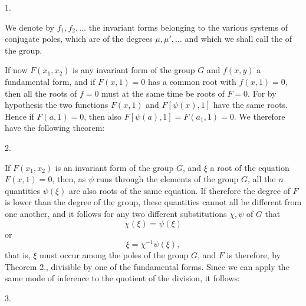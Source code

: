 
1.~

We denote by $f_1, f_2, \ldots$ the invariant forms belonging
to the various systems of conjugate poles, which are of the
degrees $\mu, \mu', \ldots$ and which we shall call the  of the group.

If now $F(x_1, x_2)$ is any invariant form of the
group $G$ and $f(x, y)$ a fundamental form, and if $F(x, 1) = 0$
has a common root with $f(x, 1) = 0$, then all the roots
of $f = 0$ must at the same time be roots of $F = 0$. For
by hypothesis the two functions $F(x, 1)$ and
$F[\psi(x), 1]$ have the same roots. Hence if $F(a, 1) = 0$,
then also $F[\psi(a), 1] = F(a_1, 1) = 0$. We therefore have the
following theorem:

2.~

If $F(x_1, x_2)$ is an invariant form of the group $G$, and $\xi$
a root of the equation $F(x, 1) = 0$, then, as
$\psi$ runs through the elements of the group $G$, all the
$n$ quantities $\psi(\xi)$ are also roots of the same equation. If therefore the
degree of $F$ is lower than the degree of the group, these
quantities cannot all be different from one another, and it
follows for any two different substitutions
$\chi, \psi$ of $G$ that
\[
\chi(\xi) = \psi(\xi)
\]
or
\[
\xi = \chi^{-1}\psi(\xi),
\]
that is, $\xi$ must occur among the poles of the group $G$, and
$F$ is therefore, by Theorem 2., divisible by one of the fundamental
forms. Since we can apply the same mode of inference to the
quotient of the division, it follows:

3.~
